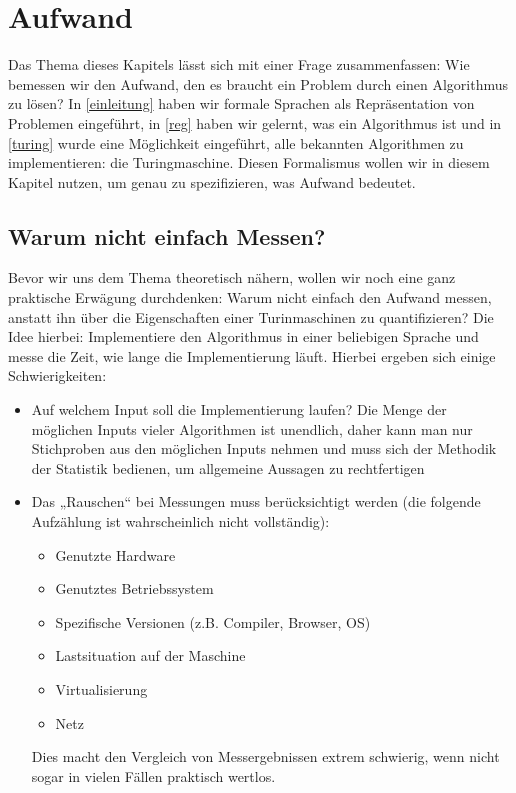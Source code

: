 \chapter{Aufwand}
Das Thema dieses Kapitels lässt sich mit einer Frage zusammenfassen:
Wie bemessen wir den Aufwand,
den es braucht ein Problem durch einen Algorithmus zu lösen?
In \autoref{einleitung} haben wir formale Sprachen als Repräsentation von Problemen eingeführt,
in \autoref{reg} haben wir gelernt, was ein Algorithmus ist und
in \autoref{turing} wurde eine Möglichkeit eingeführt,
alle bekannten Algorithmen zu implementieren:
die Turingmaschine.
Diesen Formalismus wollen wir in diesem Kapitel nutzen,
um genau zu spezifizieren,
was Aufwand bedeutet.

\section{Warum nicht einfach Messen?}\label{messenVsBeweisen}

Bevor wir uns dem Thema theoretisch nähern,
wollen wir noch eine ganz praktische Erwägung durchdenken:
Warum nicht einfach den Aufwand messen,
anstatt ihn über die Eigenschaften einer Turinmaschinen zu quantifizieren?
Die Idee hierbei:
Implementiere den Algorithmus in einer beliebigen Sprache
und messe die Zeit,
wie lange die Implementierung läuft.
Hierbei ergeben sich einige Schwierigkeiten:
\begin{itemize}
  \item Auf welchem Input soll die Implementierung laufen?
      Die Menge der möglichen Inputs vieler Algorithmen ist unendlich,
      daher kann man nur Stichproben aus den möglichen Inputs nehmen
        und muss sich der Methodik der Statistik bedienen,
        um allgemeine Aussagen zu rechtfertigen
    \item Das „Rauschen“ bei Messungen muss berücksichtigt werden
        (die folgende Aufzählung ist wahrscheinlich nicht vollständig):
      \begin{itemize}
          \item Genutzte Hardware
          \item Genutztes Betriebssystem
          \item Spezifische Versionen (z.B. Compiler, Browser, OS)
          \item Lastsituation auf der Maschine
          \item Virtualisierung
          \item Netz
      \end{itemize}
      Dies macht den Vergleich von Messergebnissen extrem schwierig,
        wenn nicht sogar in vielen Fällen praktisch wertlos.
\end{itemize}

